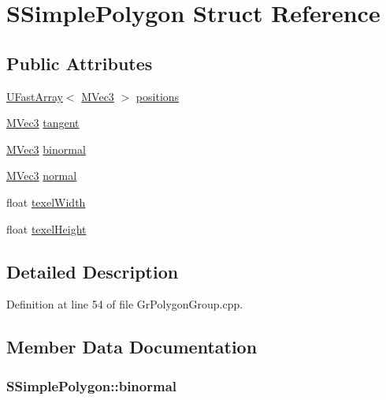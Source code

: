 \hypertarget{struct_s_simple_polygon}{
\section{SSimplePolygon Struct Reference}
\label{struct_s_simple_polygon}
}
\subsection*{Public Attributes}
\begin{CompactItemize}
\item 
\hyperlink{class_u_fast_array}{UFastArray}$<$ \hyperlink{class_m_vec3}{MVec3} $>$ \hyperlink{struct_s_simple_polygon_474a336bea3a1e9e988b9d1211772e85}{positions}
\item 
\hyperlink{class_m_vec3}{MVec3} \hyperlink{struct_s_simple_polygon_c22461865e7eff26f0fed34c6eab08c6}{tangent}
\item 
\hyperlink{class_m_vec3}{MVec3} \hyperlink{struct_s_simple_polygon_0f58581dbcc49a06ea638e7647d075da}{binormal}
\item 
\hyperlink{class_m_vec3}{MVec3} \hyperlink{struct_s_simple_polygon_0b9b7c7c6003096ce4362f81486b2c82}{normal}
\item 
float \hyperlink{struct_s_simple_polygon_fd206b6c754d78d5bdab7f57726d3cb3}{texelWidth}
\item 
float \hyperlink{struct_s_simple_polygon_615cc6a328ae01bf15c78afa713c3e10}{texelHeight}
\end{CompactItemize}


\subsection{Detailed Description}


Definition at line 54 of file GrPolygonGroup.cpp.

\subsection{Member Data Documentation}
\hypertarget{struct_s_simple_polygon_0f58581dbcc49a06ea638e7647d075da}{
\subsubsection[{binormal}]{ {\bf SSimplePolygon::binormal}}}
\label{struct_s_simple_polygon_0f58581dbcc49a06ea638e7647d075da}




